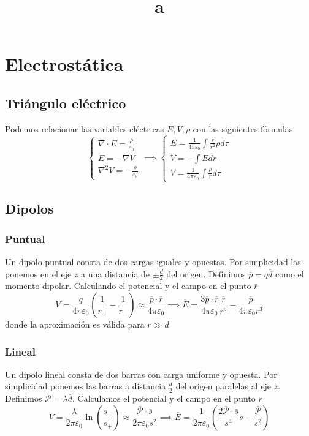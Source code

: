 \documentclass{myclass}
\title{a}
\begin{document}
\maketitle
\tableofcontents
\newpage
\section{Electrostática}
\subsection{Triángulo eléctrico}
Podemos relacionar las variables eléctricas $ E, V, \rho$ con las siguientes fórmulas
\[
  \begin{cases}
\displaystyle\nabla\cdot E = \frac{\rho}{\varepsilon_0} \\ \displaystyle E = -\nabla V \\ \displaystyle \nabla ^2 V = -\frac{\rho}{\varepsilon_0}
  \end{cases}
  \implies
  \begin{cases}
    \displaystyle E = \frac{1}{4\pi \varepsilon_0} \int \frac{\hat{r}}{r^2}\rho d\tau \\
	\displaystyle V = -\int E dr \\
	\displaystyle V = \frac{1}{4\pi \varepsilon_0 } \int \frac{\rho}{r}d\tau 
  \end{cases}
\] 

\subsection{Dipolos}
\subsubsection{Puntual}
Un dipolo puntual consta de dos cargas iguales y opuestas. Por simplicidad las ponemos en el eje $z$ a una distancia de $\pm \frac{d}{2}$ del origen. Definimos $\boxed{\overline{p} = q\overline{d}}$ como el momento dipolar. Calculando el potencial y el campo en el punto $\overline{r}$
\[
V = \frac{q}{4\pi \varepsilon_0}(\frac{1}{r_+} - \frac{1}{r_-}) \approx \frac{\overline{p}\cdot \overline{r}}{4\pi \varepsilon _0}  \implies \overline{E} = \frac{3\overline{p}\cdot \overline{r}}{4\pi \varepsilon _0} \frac{\overline{r}}{r^5} - \frac{\overline{p}}{4\pi \varepsilon _0r^3}
\] 
donde la aproximación es válida para $r\gg d$
\subsubsection{Lineal}
Un dipolo lineal consta de dos barras con carga uniforme y opuesta. Por simplicidad ponemos las barras a distancia $\frac{d}{2}$ del origen paralelas al eje $z$. Definimos $\boxed{\overline{\mathcal{P}} = \lambda \overline{d}}$. Calculamos el potencial y el campo en el punto $\overline{r}$
\[
V = \frac{\lambda}{2\pi \varepsilon _0} \ln(\frac{s_-}{s_+}) \approx \frac{\overline{\mathcal{P}}\cdot \overline{s}}{2\pi\varepsilon _0s^2} \implies \overline{E} = \frac{1}{2\pi\varepsilon _0}\left( \frac{2\overline{\mathcal{P}}\cdot \overline{s}}{s^4}\overline{s} - \frac{\overline{\mathcal{P}}}{s^2} \right) 
\] 
\end{document}
